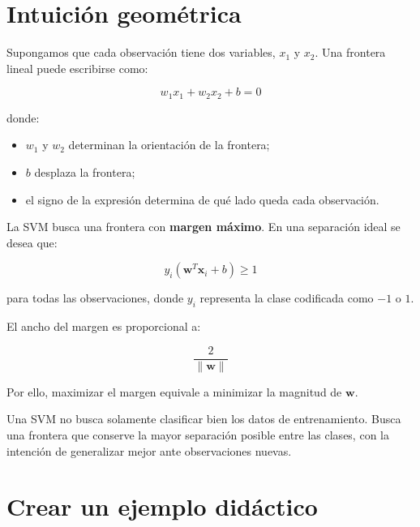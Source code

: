 \documentclass[
  spanish,
  10.5pt,
  letterpaper,
  openany,
  headings=big]{scrbook}
\providecommand{\tightlist}{%
  \setlength{\itemsep}{0pt}\setlength{\parskip}{0pt}}
\begin{document}
\section{Intuición geométrica}\label{intuiciuxf3n-geomuxe9trica}

Supongamos que cada observación tiene dos variables, \(x_1\) y \(x_2\).
Una frontera lineal puede escribirse como:

\[
w_1x_1+w_2x_2+b=0
\]

donde:

\begin{itemize}
\tightlist
\item
  \(w_1\) y \(w_2\) determinan la orientación de la frontera;
\item
  \(b\) desplaza la frontera;
\item
  el signo de la expresión determina de qué lado queda cada observación.
\end{itemize}

La SVM busca una frontera con \textbf{margen máximo}. En una separación
ideal se desea que:

\[
y_i(\mathbf{w}^{T}\mathbf{x}_i+b)\geq 1
\]

para todas las observaciones, donde \(y_i\) representa la clase
codificada como \(-1\) o \(1\).

El ancho del margen es proporcional a:

\[
\frac{2}{\lVert\mathbf{w}\rVert}
\]

Por ello, maximizar el margen equivale a minimizar la magnitud de
\(\mathbf{w}\).

\begin{tcolorbox}[enhanced jigsaw, arc=.35mm, bottomrule=.15mm, bottomtitle=1mm, breakable, colback=white, colbacktitle=quarto-callout-tip-color!10!white, colframe=quarto-callout-tip-color-frame, coltitle=black, left=2mm, leftrule=.75mm, opacityback=0, opacitybacktitle=0.6, rightrule=.15mm, title=\textcolor{quarto-callout-tip-color}{\faLightbulb}\hspace{0.5em}{Idea esencial}, titlerule=0mm, toprule=.15mm, toptitle=1mm]

Una SVM no busca solamente clasificar bien los datos de entrenamiento.
Busca una frontera que conserve la mayor separación posible entre las
clases, con la intención de generalizar mejor ante observaciones nuevas.

\end{tcolorbox}

\section{Crear un ejemplo
didáctico}\label{crear-un-ejemplo-diduxe1ctico}
\end{document}
